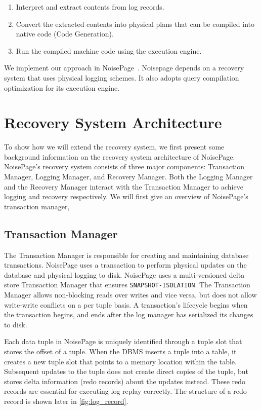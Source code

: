 \documentclass[12pt]{cmuthesis}
\begin{document}
\begin{enumerate}
\item Interpret and extract contents from log records.
\item Convert the extracted contents into physical plans that can be compiled into native code (Code Generation).
\item Run the compiled machine code using the execution engine.
\end{enumerate}
We implement our approach in NoisePage~\cite{noisepage}. Noisepage depends on a recovery system that uses physical logging schemes. It also adopts query compilation optimization for its execution engine.

\section{Recovery System Architecture}
 To show how we will extend the recovery system, we first present some background information on the recovery system architecture of NoisePage. NoisePage's recovery system consists of three major components: Transaction Manager, Logging Manager, and Recovery Manager. Both the Logging Manager and the Recovery Manager interact with the Transaction Manager to achieve logging and recovery respectively. We will first give an overview of NoisePage's transaction manager, 

\subsection{Transaction Manager}
The Transaction Manager is responsible for creating and maintaining database transactions. NoisePage uses a transaction to perform physical updates on the database and physical logging to disk. NoisePage uses a multi-versioned delta store Transaction Manager that ensures \texttt{SNAPSHOT-ISOLATION}. The Transaction Manager allows non-blocking reads over writes and vice versa, but does not allow write-write conflicts on a per tuple basis. A transaction's lifecycle begins when the transaction begins, and ends after the log manager has serialized its changes to disk.

Each data tuple in NoisePage is uniquely identified through a tuple slot that stores the offset of a tuple. When the DBMS inserts a tuple into a table, it creates a new tuple slot that points to a memory location within the table. Subsequent updates to the tuple does not create direct copies of the tuple, but stores delta information (redo records) about the updates instead. These redo records are essential for executing log replay correctly. The structure of a redo record is shown later in \cref{fig:log_record}.
\end{document}
